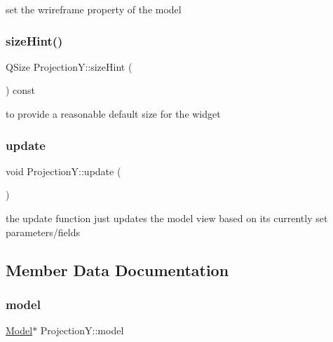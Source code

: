 set the wrireframe property of the model 

\mbox{\label{class_projection_y_a8d502c7b1fc7cb5c894a84f10fba7368}} 
\subsubsection{\texorpdfstring{size\+Hint()}{sizeHint()}}
{\footnotesize\ttfamily Q\+Size Projection\+Y\+::size\+Hint (\begin{DoxyParamCaption}{ }\end{DoxyParamCaption}) const\hspace{0.3cm}{\ttfamily [protected]}}



to provide a reasonable default size for the widget 

\mbox{\label{class_projection_y_a3c709da38e36be432cdc3979cf37d527}} 
\subsubsection{\texorpdfstring{update}{update}}
{\footnotesize\ttfamily void Projection\+Y\+::update (\begin{DoxyParamCaption}{ }\end{DoxyParamCaption})\hspace{0.3cm}{\ttfamily [slot]}}



the update function just updates the model view based on its currently set parameters/fields 



\subsection{Member Data Documentation}
\mbox{\label{class_projection_y_a5fef5122782e5ed50e7dd2f302628852}} 
\subsubsection{\texorpdfstring{model}{model}}
{\footnotesize\ttfamily \mbox{\hyperlink{class_model}{Model}}$\ast$ Projection\+Y\+::model}



